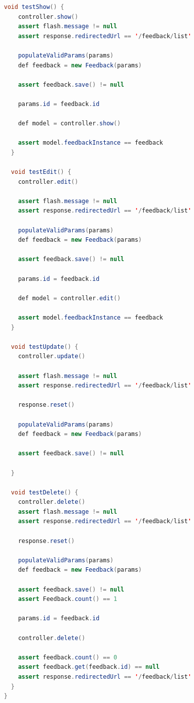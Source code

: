 \begin{lstlisting}[language=java, label=test-controller-feedback, caption=Fragmento do arquivo de teste gerado para a \lstinline|FeedbackController|]
  void testShow() {
    controller.show()
    assert flash.message != null
    assert response.redirectedUrl == '/feedback/list'

    populateValidParams(params)
    def feedback = new Feedback(params)

    assert feedback.save() != null

    params.id = feedback.id

    def model = controller.show()

    assert model.feedbackInstance == feedback
  }

  void testEdit() {
    controller.edit()

    assert flash.message != null
    assert response.redirectedUrl == '/feedback/list'

    populateValidParams(params)
    def feedback = new Feedback(params)

    assert feedback.save() != null

    params.id = feedback.id

    def model = controller.edit()

    assert model.feedbackInstance == feedback
  }

  void testUpdate() {
    controller.update()

    assert flash.message != null
    assert response.redirectedUrl == '/feedback/list'

    response.reset()

    populateValidParams(params)
    def feedback = new Feedback(params)

    assert feedback.save() != null

  }

  void testDelete() {
    controller.delete()
    assert flash.message != null
    assert response.redirectedUrl == '/feedback/list'

    response.reset()

    populateValidParams(params)
    def feedback = new Feedback(params)

    assert feedback.save() != null
    assert Feedback.count() == 1

    params.id = feedback.id

    controller.delete()

    assert feedback.count() == 0
    assert feedback.get(feedback.id) == null
    assert response.redirectedUrl == '/feedback/list'
  }
}
\end{lstlisting}

